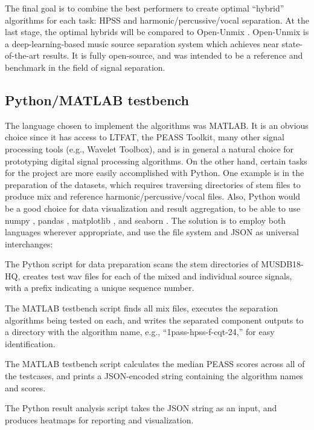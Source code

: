 \documentclass[letter,12pt]{article}
\newenvironment{tight_enumerate}{
\begin{enumerate}
  \setlength{\itemsep}{0pt}
  \setlength{\parskip}{0pt}
}{\end{enumerate}}
\begin{document}
The final goal is to combine the best performers to create optimal ``hybrid'' algorithms for each task: HPSS and harmonic/percussive/vocal separation. At the last stage, the optimal hybrids will be compared to Open-Unmix \cite{umx}. Open-Unmix is a deep-learning-based music source separation system which achieves near state-of-the-art results. It is fully open-source, and was intended to be a reference and benchmark in the field of signal separation.

\subsection{Python/MATLAB testbench}

The language chosen to implement the algorithms was MATLAB. It is an obvious choice since it has access to LTFAT, the PEASS Toolkit, many other signal processing tools (e.g., Wavelet Toolbox), and is in general a natural choice for prototyping digital signal processing algorithms. On the other hand, certain tasks for the project are more easily accomplished with Python. One example is in the preparation of the datasets, which requires traversing directories of stem files to produce mix and reference harmonic/percussive/vocal files. Also, Python would be a good choice for data visualization and result aggregation, to be able to use numpy \cite{numpy}, pandas \cite{pandas}, matplotlib \cite{matplotlib}, and seaborn \cite{seaborn}. The solution is to employ both languages wherever appropriate, and use the file system and JSON as universal interchanges:
\begin{tight_enumerate}
\item
	The Python script for data preparation scans the stem directories of MUSDB18-HQ, creates test wav files for each of the mixed and individual source signals, with a prefix indicating a unique sequence number.
\item
	The MATLAB testbench script finds all mix files, executes the separation algorithms being tested on each, and writes the separated component outputs to a directory with the algorithm name, e.g., ``1pass-hpss-f-cqt-24,'' for easy identification.
\item
	The MATLAB testbench script calculates the median PEASS scores across all of the testcases, and prints a JSON-encoded string containing the algorithm names and scores.
\item
	The Python result analysis script takes the JSON string as an input, and produces heatmaps for reporting and visualization.
\end{tight_enumerate}
\end{document}
